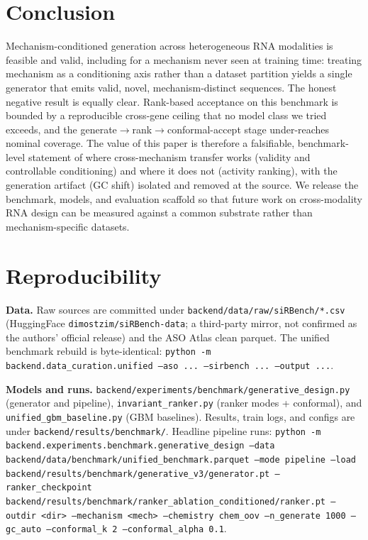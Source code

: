 \documentclass{article} %
\begin{document}
\section{Conclusion}

Mechanism-conditioned generation across heterogeneous RNA modalities is feasible and valid, including for a mechanism never seen at training time: treating mechanism as a conditioning axis rather than a dataset partition yields a single generator that emits valid, novel, mechanism-distinct sequences. The honest negative result is equally clear. Rank-based acceptance on this benchmark is bounded by a reproducible cross-gene ceiling that no model class we tried exceeds, and the generate$\rightarrow$rank$\rightarrow$conformal-accept stage under-reaches nominal coverage. The value of this paper is therefore a falsifiable, benchmark-level statement of where cross-mechanism transfer works (validity and controllable conditioning) and where it does not (activity ranking), with the generation artifact (GC shift) isolated and removed at the source. We release the benchmark, models, and evaluation scaffold so that future work on cross-modality RNA design can be measured against a common substrate rather than mechanism-specific datasets.

\section*{Reproducibility}

\textbf{Data.} Raw sources are committed under \texttt{backend/data/raw/siRBench/*.csv} (HuggingFace \texttt{dimostzim/siRBench-data}; a third-party mirror, not confirmed as the authors' official release) and the ASO Atlas clean parquet. The unified benchmark rebuild is byte-identical:
\texttt{python -m backend.data\_curation.unified --aso ... --sirbench ... --output ...}.

\textbf{Models and runs.} \texttt{backend/experiments/benchmark/generative\_design.py} (generator and pipeline), \texttt{invariant\_ranker.py} (ranker modes + conformal), and \texttt{unified\_gbm\_baseline.py} (GBM baselines). Results, train logs, and configs are under \texttt{backend/results/benchmark/}. Headline pipeline runs:
\texttt{python -m backend.experiments.benchmark.generative\_design --data backend/data/benchmark/unified\_benchmark.parquet --mode pipeline --load backend/results/benchmark/generative\_v3/generator.pt --ranker\_checkpoint backend/results/benchmark/ranker\_ablation\_conditioned/ranker.pt --outdir <dir> --mechanism <mech> --chemistry chem\_oov --n\_generate 1000 --gc\_auto --conformal\_k 2 --conformal\_alpha 0.1}.
\end{document}
